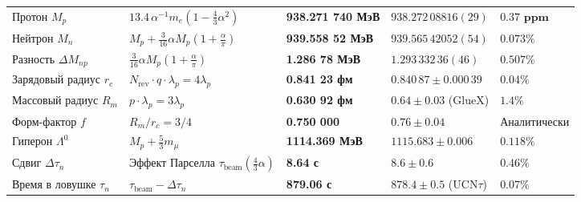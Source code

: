 \documentclass[11pt,a4paper]{article}
\theoremstyle{definition}
\theoremstyle{remark}
\begin{document}
\begin{xltabular}{\textwidth}{>{\raggedright\arraybackslash}p{3.2cm} X >{\centering\arraybackslash}p{2.7cm} >{\centering\arraybackslash}p{3.0cm} >{\raggedleft\arraybackslash}p{2.1cm}}
 \\
\midrule
Протон $M_p$ & $13.4 \, \alpha^{-1} m_e (1 - \frac{4}{3}\alpha^2)$ & \textbf{938.271 740 МэВ} & $938.272\,08816(29)$ & $\mathbf{0.37\text{ ppm}}$ \\
Нейтрон $M_n$ & $M_p + \frac{3}{16}\alpha M_p (1+\frac{\alpha}{\pi})$ & \textbf{939.558 52 МэВ} & $939.565\,42052(54)$ & $0.073\%$ \\
Разность $\Delta M_{np}$ & $\frac{3}{16}\alpha M_p (1+\frac{\alpha}{\pi})$ & \textbf{1.286 78 МэВ} & $1.293\,332\,36(46)$ & $0.507\%$ \\
Зарядовый радиус $r_c$ & $N_{\mathrm{rev}} \cdot q \cdot \lambda_p = 4\lambda_p$ & \textbf{0.841 23 фм} & $0.840\,87 \pm 0.000\,39$ & $0.04\%$ \\
Массовый радиус $R_m$ & $p \cdot \lambda_p = 3\lambda_p$ & \textbf{0.630 92 фм} & $0.64 \pm 0.03$ (GlueX) & $1.4\%$ \\
Форм-фактор $f$ & $R_m / r_c = 3/4$ & \textbf{0.750 000} & $0.76 \pm 0.04$ & Аналитически \\
Гиперон $\Lambda^0$ & $M_p + \frac{5}{3} m_\mu$ & \textbf{1114.369 МэВ} & $1115.683 \pm 0.006$ & $0.118\%$ \\
Сдвиг $\Delta\tau_n$ & Эффект Парселла $\tau_{\mathrm{beam}}(\frac{4}{3}\alpha)$ & \textbf{8.64 с} & $8.6 \pm 0.6$ & $0.46\%$ \\
Время в ловушке $\tau_n$ & $\tau_{\mathrm{beam}} - \Delta\tau_n$ & \textbf{879.06 с} & $878.4 \pm 0.5$ ($\mathrm{UCN}\tau$) & $0.07\%$ \\
\midrule


\end{xltabular}
\end{document}
